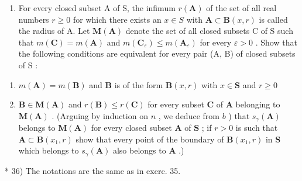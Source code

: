 \begin{enumerate}
\def\labelenumi{\alph{enumi})}
\setcounter{enumi}{2}
\tightlist
\item
  For every closed subset A of S, the infimum \(r(\mathbf{A})\) of the set of all real numbers \(r \geqslant 0\) for which there exists an \(x \in S\) with \(\mathbf{A} \subset \mathbf{B}(x, r)\) is called the radius of A. Let \(\mathbf{M}(\mathbf{A})\) denote the set of all closed subsets C of S such that \(m(\mathbf{C}) = m(\mathbf{A})\) and \(m(\mathbf{C}_{\varepsilon}) \leqslant m(\mathbf{A}_{\varepsilon})\) for every \(\varepsilon > 0\) . Show that the following conditions are equivalent for every pair (A, B) of closed subsets of S :
\end{enumerate}

\begin{enumerate}
\def\labelenumi{(\roman{enumi})}
\item
  \(m(\mathbf{A}) = m(\mathbf{B})\) and \(\mathbf{B}\) is of the form \(\mathbf{B}(x,r)\) with \(x\in \mathbf{S}\) and \(r\geqslant 0\)
\item
  \(\mathbf{B} \in \mathbf{M}(\mathbf{A})\) and \(r(\mathbf{B}) \leqslant r(\mathbf{C})\) for every subset \(\mathbf{C}\) of \(\mathbf{A}\) belonging to \(\mathbf{M}(\mathbf{A})\) . (Arguing by induction on \(n\) , we deduce from \(b\) ) that \(s_{\gamma}(\mathbf{A})\) belongs to \(\mathbf{M}(\mathbf{A})\) for every closed subset \(\mathbf{A}\) of \(\mathbf{S}\) ; if \(r > 0\) is such that \(\mathbf{A} \subset \mathbf{B}(x_1, r)\) show that every point of the boundary of \(\mathbf{B}(x_1, r)\) in \(\mathbf{S}\) which belongs to \(s_{\gamma}(\mathbf{A})\) also belongs to \(\mathbf{A}\) .)
\end{enumerate}

* 36) The notations are the same as in exerc. 35.

